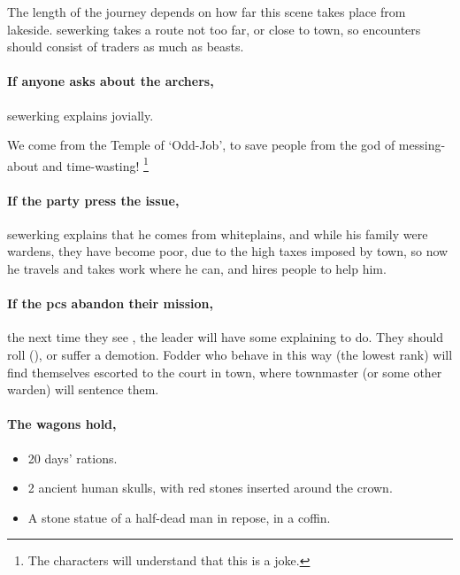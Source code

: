 The length of the journey depends on how far this scene takes place from \gls{lakeside}.
\Gls{sewerking} takes a route not too far, or close to town, so encounters should consist of traders as much as beasts.

\paragraph{If anyone asks about the archers,}
\gls{sewerking} explains jovially.

\begin{speechtext}
  We come from the Temple of `Odd-Job', to save people from the god of messing-about and time-wasting!%
  \footnote{The characters will understand that this is a joke.}
\end{speechtext}

\paragraph{If the party press the issue,}
\gls{sewerking} explains that he comes from \gls{whiteplains}, and while his family were \glspl{warden}, they have become poor, due to the high taxes imposed by \gls{town}, so now he travels and takes work where he can, and hires people to help him.

\paragraph{If the \glspl{pc} abandon their mission,}
the next time they see , the leader will have some explaining to do.
They should roll  (\tn[12]), or suffer a demotion.
Fodder who behave in this way (the lowest rank) will find themselves escorted to the \gls{court} in \gls{town}, where \gls{townmaster} (or some other \gls{warden}) will sentence them.%

\paragraph{The wagons hold,}

\begin{itemize}
  \item
  20 days' rations.
  \item
  2 ancient human skulls, with red stones inserted around the crown.
  \label{skullCrown}
  \item
  A stone statue of a half-dead man in repose, in a coffin.
\end{itemize}

